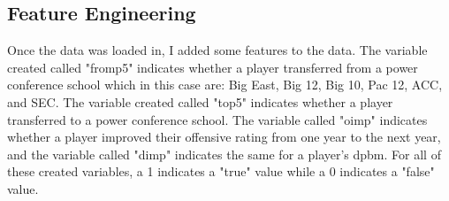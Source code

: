 \documentclass[12pt]{article}
\begin{document}
\subsection{Feature Engineering}
\label{subsec:feature_eng}
Once the data was loaded in, I added some features to the data. The variable created called "fromp5" indicates whether a player transferred from a power conference school which in this case are: Big East, Big 12, Big 10, Pac 12, ACC, and SEC. The variable created called "top5" indicates whether a player transferred to a power conference school. The variable called "oimp" indicates whether a player improved their offensive rating from one year to the next year, and the variable called "dimp" indicates the same for a player's dpbm. For all of these created variables, a 1 indicates a "true" value while a 0 indicates a "false" value.
\end{document}
